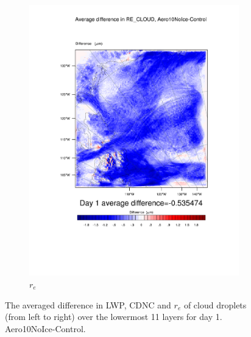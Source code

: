 \begin{figure}[hb]
	\begin{subfigure}{0.40\textwidth}
		\centering
		\includegraphics[width=\textwidth]{results/aero10ni/diff_Aero10NoIce_RE_CLOUD_Day1.pdf}
		\caption{$r_e$}
		\label{subfig:recloud_r4Day1}
	\end{subfigure}
\caption{The averaged difference in LWP, CDNC and $r_e$ of cloud droplets (from left to right) over the lowermost 11 layers for day 1. Aero10NoIce-Control.}
\label{fig:lwpcdncre_r4Day1}
\end{figure}

